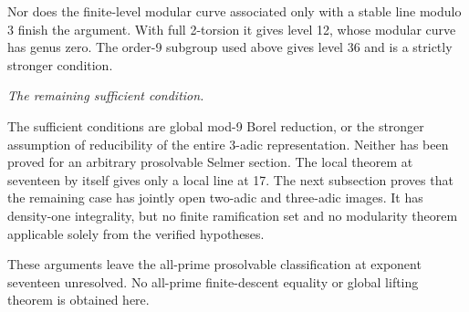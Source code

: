 \begin{remark}
Nor does the finite-level modular curve associated only with a stable
line modulo 3 finish the argument. With full 2-torsion it gives level
12, whose modular curve has genus zero. The order-9 subgroup used above
gives level 36 and is a strictly stronger condition.

\end{remark}

\par\medskip\noindent\textit{The remaining sufficient condition.}\quad 

The sufficient conditions are global mod-9 Borel reduction, or
the stronger assumption of reducibility of the entire 3-adic
representation. Neither has been proved for an arbitrary prosolvable
Selmer section. The local theorem at seventeen by itself gives only a local line at
17. The next subsection proves that the remaining case has jointly open
two-adic and three-adic images. It has density-one integrality, but no
finite ramification set and no modularity theorem applicable solely from
the verified hypotheses.

These arguments leave the all-prime prosolvable classification at
exponent seventeen unresolved. No all-prime finite-descent equality or
global lifting theorem is obtained here.
